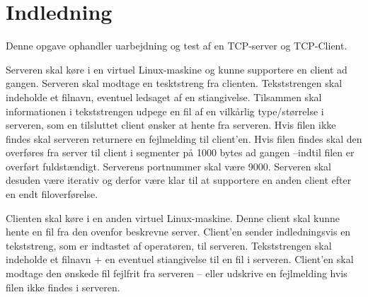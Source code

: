 \chapter{Indledning}\label{ch:introduction}
Denne opgave ophandler uarbejdning og test af en TCP-server og TCP-Client. 

Serveren skal køre i en virtuel Linux-maskine og kunne supportere en client ad gangen. Serveren skal modtage en tesktstreng fra clienten. Tekststrengen skal indeholde et filnavn, eventuel ledsaget af en stiangivelse. Tilsammen skal informationen i tekststrengen udpege en fil af en vilkårlig type/størrelse i serveren, som en tilsluttet client ønsker at hente fra serveren. Hvis filen ikke findes skal serveren returnere en fejlmelding til client’en. Hvis filen findes skal den overføres fra server til client i segmenter på 1000 bytes ad gangen –indtil filen er overført fuldstændigt. Serverens portnummer skal være 9000. 
Serveren skal desuden være iterativ og derfor være klar til at supportere en anden client efter en endt filoverførelse.

Clienten skal køre i en anden virtuel Linux-maskine. Denne client skal kunne hente en fil fra den ovenfor beskrevne server. Client’en sender indledningsvis en tekststreng, som er indtastet af operatøren, til serveren. Tekststrengen skal indeholde et filnavn + en eventuel stiangivelse til en fil i serveren. Client’en skal modtage den ønskede fil fejlfrit fra serveren – eller udskrive en fejlmelding hvis filen ikke findes i serveren.